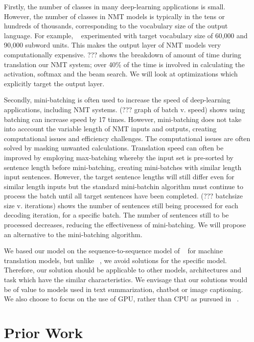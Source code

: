 \documentclass[11pt,a4paper]{article}
\begin{document}
Firstly, the number of classes in many deep-learning applications is small. However, the number of classes in NMT models is typically in the tens or hundreds of thousands, corresponding to the vocabulary size of the output language. For example, ~\cite{sennrich-haddow-birch:2016:P16-12} experimented with target vocabulary size of 60,000 and 90,000 subword units. This makes the output layer of NMT models very computationally expensive. ??? shows the breakdown of amount of time during translation our NMT system; over 40\% of the time is involved in calculating the activation, softmax and the beam search. We will look at optimizations which explicitly target the output layer.

Secondly, mini-batching is often used to increase the speed of deep-learning applications, including NMT systems. (??? graph of batch v. speed) shows using batching can increase speed by 17 times. However, mini-batching does not take into acccount the variable length of NMT inputs and outputs, creating computational issues and efficiency challenges. The computational issues are often solved by masking unwanted calculations. Translation speed can often be improved by employing max-batching whereby the input set is pre-sorted by sentence length before mini-batching, creating mini-batches with similar length input sentences. However, the target sentence lengths will still differ even for similar length inputs but the standard mini-batchin algorithm must continue to process the batch until all target sentences have been completed. (??? batchsize size v. iterations) shows the number of sentences still being processed for each decoding iteration, for a specific batch. The number of sentences still to be processed decreases, reducing the effectiveness of mini-batching. We will propose an alternative to the mini-batching algorithm.

We based our model on the sequence-to-sequence model of ~\cite{D14-1179} for machine translation models, but unlike ~\cite{DBLP:conf/emnlp/Devlin17}, we avoid solutions for the specific model. Therefore, our solution should be applicable to other models, architectures and task which have the similar characteristics. We envisage that our solutions would be of value to models used in text summarization, chatbot or image captioning. We also choose to focus on the use of GPU, rather than CPU as pursued in ~\cite{DBLP:conf/emnlp/Devlin17}.

\section{Prior Work}
\end{document}
